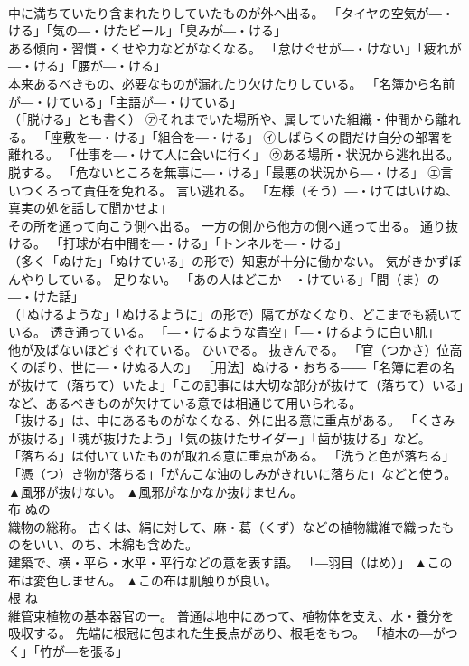 \documentclass[8pt]{extreport}
\begin{document}
\begin{CJK}{UTF8}{min}
\\	中に満ちていたり含まれたりしていたものが外へ出る。 「タイヤの空気が―・ける」「気の―・けたビール」「臭みが―・ける」 
\\	ある傾向・習慣・くせや力などがなくなる。 「怠けぐせが―・けない」「疲れが―・ける」「腰が―・ける」 
\\	本来あるべきもの、必要なものが漏れたり欠けたりしている。 「名簿から名前が―・けている」「主語が―・けている」 
\\	（「脱ける」とも書く） ㋐それまでいた場所や、属していた組織・仲間から離れる。 「座敷を―・ける」「組合を―・ける」 ㋑しばらくの間だけ自分の部署を離れる。 「仕事を―・けて人に会いに行く」 ㋒ある場所・状況から逃れ出る。 脱する。 「危ないところを無事に―・ける」「最悪の状況から―・ける」 ㋓言いつくろって責任を免れる。 言い逃れる。 「左様（そう）―・けてはいけぬ、真実の処を話して聞かせよ」 
\\	その所を通って向こう側へ出る。 一方の側から他方の側へ通って出る。 通り抜ける。 「打球が右中間を―・ける」「トンネルを―・ける」 
\\	（多く「ぬけた」「ぬけている」の形で）知恵が十分に働かない。 気がきかずぼんやりしている。 足りない。 「あの人はどこか―・けている」「間（ま）の―・けた話」 
\\	（「ぬけるような」「ぬけるように」の形で）隔てがなくなり、どこまでも続いている。 透き通っている。 「―・けるような青空」「―・けるように白い肌」 
\\	他が及ばないほどすぐれている。 ひいでる。 抜きんでる。 「官（つかさ）位高くのぼり、世に―・けぬる人の」 ［用法］ぬける・おちる――「名簿に君の名が抜けて（落ちて）いたよ」「この記事には大切な部分が抜けて（落ちて）いる」など、あるべきものが欠けている意では相通じて用いられる。 
\\	「抜ける」は、中にあるものがなくなる、外に出る意に重点がある。 「くさみが抜ける」「魂が抜けたよう」「気の抜けたサイダー」「歯が抜ける」など。 
\\	「落ちる」は付いていたものが取れる意に重点がある。 「洗うと色が落ちる」「憑（つ）き物が落ちる」「がんこな油のしみがきれいに落ちた」などと使う。	▲風邪が抜けない。 ▲風邪がなかなか抜けません。
\\	布	ぬの	
\\	織物の総称。 古くは、絹に対して、麻・葛（くず）などの植物繊維で織ったものをいい、のち、木綿も含めた。 
\\	建築で、横・平ら・水平・平行などの意を表す語。 「―羽目（はめ）」	▲この布は変色しません。 ▲この布は肌触りが良い。
\\	根	ね	
\\	維管束植物の基本器官の一。 普通は地中にあって、植物体を支え、水・養分を吸収する。 先端に根冠に包まれた生長点があり、根毛をもつ。 「植木の―がつく」「竹が―を張る」 

\end{CJK}
\end{document}

